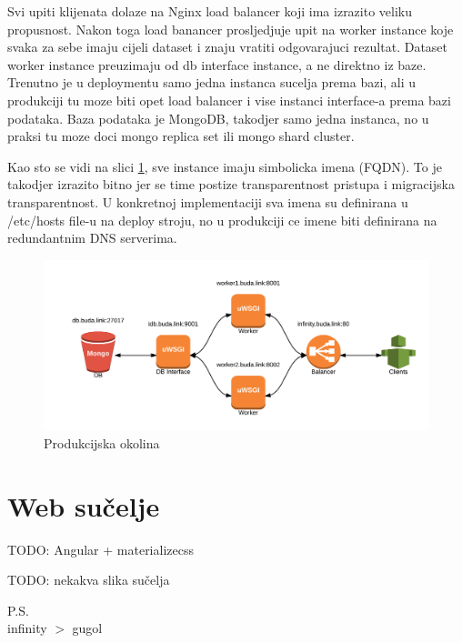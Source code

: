 \documentclass[a4paper,12pt]{article}
\begin{document}
Svi upiti klijenata dolaze na Nginx load balancer koji ima izrazito veliku propusnost. Nakon toga load banancer prosljedjuje upit na worker instance koje svaka za sebe imaju cijeli dataset i znaju vratiti odgovarajuci rezultat. Dataset worker instance preuzimaju od db interface instance, a ne direktno iz baze. Trenutno je u deploymentu samo jedna instanca sucelja prema bazi, ali u produkciji tu moze biti opet load balancer i vise instanci interface-a prema bazi podataka. Baza podataka je MongoDB, takodjer samo jedna instanca, no u praksi tu moze doci mongo replica set ili mongo shard cluster.

Kao sto se vidi na slici \ref{production_environment}, sve instance imaju simbolicka imena (FQDN). To je takodjer izrazito bitno jer se time postize transparentnost pristupa i migracijska transparentnost. U konkretnoj implementaciji sva imena su definirana u /etc/hosts file-u na deploy stroju, no u produkciji ce imene biti definirana na redundantnim DNS serverima.

\begin{figure}[!htbp]
\begin{center}
\includegraphics[width=\textwidth]{infinity.png}
\end{center}
\caption{Produkcijska okolina}\label{production_environment}
\end{figure}

\section{Web sučelje}

TODO: Angular + materializecss

TODO: nekakva slika sučelja

\vspace{1cm}
P.S.
\\[0.3cm]
infinity $>$ gugol



\end{document}
